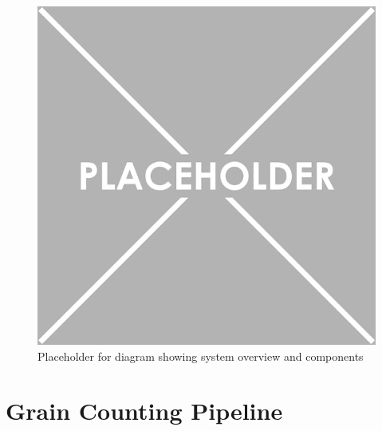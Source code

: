 \begin{figure}[ht!]
\centering
\includegraphics[scale=2.5]{Placeholder}
\caption{Placeholder for diagram showing system overview and components}
\label{fig1}
\end{figure}

\smallskip

\goodbreak
\section{Grain Counting Pipeline}
